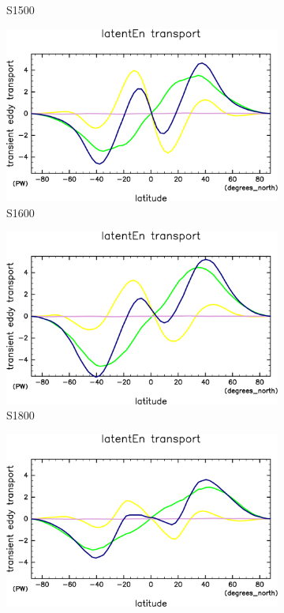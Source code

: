 \documentclass[body]{subfiles}
\begin{document}
\begin{figure}[t]
\begin{subfigure}{.4\textwidth}
		\caption{S1500}\label{潜熱S1500}
	\end{subfigure}
	\begin{subfigure}{.4\textwidth}
		\centering
		\includegraphics[width=\textwidth]{S1600/MeriHeatTrans@latentEn,time=3650:4015-crop-rotate.pdf}
		\caption{S1600}\label{潜熱S1600}
	\end{subfigure}
	\begin{subfigure}{.4\textwidth}
		\centering
		\includegraphics[width=\textwidth]{S1800/MeriHeatTrans@latentEn,time=3650:4015-crop-rotate.pdf}
		\caption{S1800}\label{潜熱S1800}
	\end{subfigure}
	\begin{subfigure}{.4\textwidth}
		\centering
		\includegraphics[width=\textwidth]{S2000/MeriHeatTrans@latentEn,time=7300:7665-crop-rotate.pdf}

\end{subfigure}
\end{figure}
\end{document}
